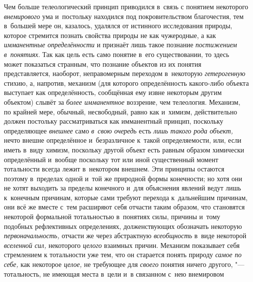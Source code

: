 Чем больше телеологический принцип приводился в~связь с
понятием некоторого {\em внемирового}
ума и~постольку находился под покровительством благочестия,
тем в~большей мере он, казалось, удалялся от истинного исследования
природы, которое стремится познать свойства природы не как чужеродные, а
как {\em имманентные определённости}
и признаёт лишь такое познание
{\em постижением в~понятиях}.
Так как цель есть само понятие в~его существовании, то здесь
может показаться странным, что познание объектов из их понятия
представляется, наоборот, неправомерным переходом в~некоторую
{\em гетерогенную}
стихию, а, напротив, механизм (для которого определённость
какого-либо объекта выступает как определённость, сообщённая ему извне
некоторым другим объектом) слывёт за
{\em более имманентное}
воззрение, чем телеология. Механизм, по крайней мере,
обычный, несвободный, равно как и~химизм, действительно должен постольку
рассматриваться как имманентный принцип, поскольку определяющее
{\em внешнее} само
{\em в~свою очередь} есть
{\em лишь такого рода объект,}
нечто внешне определённое и~безразличное к~такой
определяемости, или, если иметь в~виду химизм, поскольку другой объект есть
равным образом химически определённый и~вообще поскольку тот или иной
существенный момент тотальности всегда лежит в~некотором внешнем. Эти
принципы остаются поэтому в~пределах одной и~той же природной формы
конечности; но хотя они не хотят выходить за пределы
конечного и~для объяснения явлений ведут лишь к~конечным причинам, которые
сами требуют перехода к~дальнейшим причинам, они всё же вместе с~тем
расширяют себя отчасти таким образом, что становятся некоторой формальной
тотальностью в~понятиях силы, причины и~тому подобных рефлективных
определениях, долженствующих обозначать некоторую
{\em первоначальность,}
отчасти же через абстрактную
{\em всеобщность} в~виде
некоторой {\em вселенной сил,}
некоторого {\em целого}
взаимных причин. Механизм показывает себя стремлением к
тотальности уже тем, что он старается понять природу
{\em самое по себе,} как
некоторое {\em целое,} не
требующее для {\em своего}
понятия ничего другого, "--- тотальность, не
имеющая места в~цели и~в связанном с~нею внемировом
